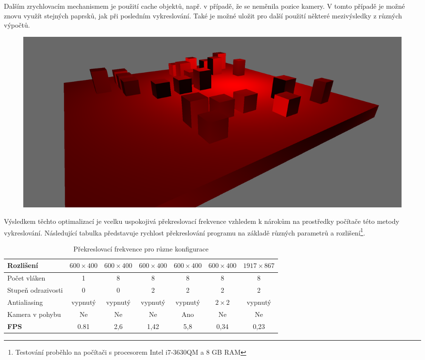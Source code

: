 \documentclass[12pt,a4paper,titlepage,final]{report}
\begin{document}
Dalším zrychlovacím mechanismem je použití cache objektů, např. v případě, že se neměnila pozice kamery. V tomto případě je možné znovu využít stejných paprsků, jak při posledním vykreslování. Také je možné uložit pro další použití některé mezivýsledky z různých výpočtů.

\begin{figure}[H]
	\centering
	\captionsetup{type=figure}
	\includegraphics[width=0.8\linewidth]{images/camera.png}
	\label{camera}
\end{figure}

Výsledkem těchto optimalizací je vcelku uspokojivá překreslovací frekvence vzhledem k nárokům na prostředky počítače této metody vykreslování. Následující tabulka představuje rychlost překreslování programu na základě různých parametrů a rozlišení\footnote{Testování proběhlo na počítači s procesorem Intel i7-3630QM a 8 GB RAM}.

\begin{table}[H]
	\begin{center}
		\begin{tabular}{| l | c | c | c | c| c | c |}
			\hline
			Rozlišení & $600\times400$ & $600\times400$ & $600\times400$ & $600\times400$ & $600\times400$ & $1917\times867$
			\\ \hline
			
			Počet vláken & 1 & 8 & 8 & 8 & 8 & 8
			\\ \hline
			
			Stupeň odrazivosti & 0 & 0 & 2 & 2 & 2 & 2
			\\ \hline
			
			Antialiasing & vypnutý & vypnutý & vypnutý & vypnutý & $2\times2$ & vypnutý
			\\ \hline
			
			Kamera v pohybu & Ne & Ne & Ne & Ano & Ne & Ne
			\\ \hline
			
			\textbf{FPS} & 0.81 & 2,6 & 1,42 & 5,8 & 0,34 & 0,23
			\\ \hline
		\end{tabular}
	\end{center}	
	\caption{Překreslovací frekvence pro různe konfigurace}  
\end{table}
\end{document}
